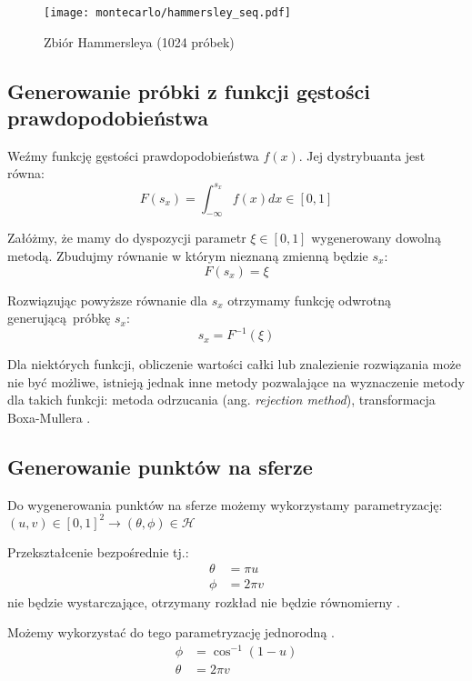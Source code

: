\documentclass[../main.tex]{subfiles}
\begin{document}
\begin{figure}[h]
  \centering
  \texttt{[image: montecarlo/hammersley\_seq.pdf]}
  \caption{Zbiór Hammersleya (1024 próbek)}
  \label{fig:HammersleySamples}
\end{figure}

\subsection{Generowanie próbki z funkcji gęstości prawdopodobieństwa}

Weźmy funkcję gęstości prawdopodobieństwa $f(x)$. Jej dystrybuanta jest równa:
\[ 
F(s_x) = \int_{-\infty}^{s_{x}} f(x) dx \in [0,1] 
\]

Załóżmy, że mamy do dyspozycji parametr $\xi \in [0,1]$ wygenerowany dowolną
metodą. Zbudujmy równanie w którym nieznaną zmienną będzie $s_x$:
\[ 
F(s_x) = \xi
\]

Rozwiązując powyższe równanie dla $s_x$ otrzymamy funkcję odwrotną generującą próbkę
$s_x$:
\[
s_x = F^{-1}(\xi)
\]

Dla niektórych funkcji, obliczenie wartości całki lub znalezienie rozwiązania może nie być możliwe, istnieją jednak inne metody pozwalające na wyznaczenie metody dla takich funkcji: metoda odrzucania (ang. \textit{rejection method}), transformacja Boxa-Mullera \cite{pbrt}.

\subsection{Generowanie punktów na sferze}

Do wygenerowania punktów na sferze możemy wykorzystamy parametryzację:
  $(u,v) \in [0,1]^2 \rightarrow (\theta, \phi) \in \mathcal{H}$

Przekształcenie bezpośrednie tj.:
\begin{align*}
	\theta &= \pi u \\
 	\phi &= 2 \pi v
\end{align*}
\noindent nie będzie wystarczające, otrzymany rozkład nie będzie równomierny
\cite{WolframSpherePointPicking}.

Możemy wykorzystać do tego parametryzację jednorodną \cite{dammertz_2012}
.
\begin{align*}
	\phi &= \cos^{-1}(1-u) \\
	\theta &= 2 \pi v
\end{align*}
\end{document}
